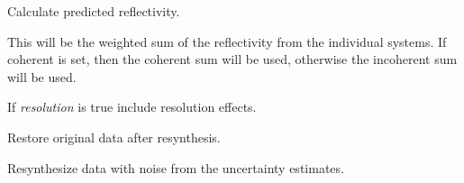 \documentclass[letterpaper,10pt,english]{sphinxmanual}
\begin{document}
\begin{fulllineitems}

\begin{fulllineitems}
\label{api/experiment:refl1d.experiment.MixedExperiment.plot_reflectivity}
\end{fulllineitems}


\begin{fulllineitems}
\label{api/experiment:refl1d.experiment.MixedExperiment.reflectivity}
Calculate predicted reflectivity.

This will be the weighted sum of the reflectivity from the
individual systems.  If coherent is set, then the coherent
sum will be used, otherwise the incoherent sum will be used.

If \emph{resolution} is true include resolution effects.

\end{fulllineitems}


\begin{fulllineitems}
\label{api/experiment:refl1d.experiment.MixedExperiment.residuals}
\end{fulllineitems}


\begin{fulllineitems}
\label{api/experiment:refl1d.experiment.MixedExperiment.restore_data}
Restore original data after resynthesis.

\end{fulllineitems}


\begin{fulllineitems}
\label{api/experiment:refl1d.experiment.MixedExperiment.resynth_data}
Resynthesize data with noise from the uncertainty estimates.

\end{fulllineitems}


\end{fulllineitems}
\end{document}

